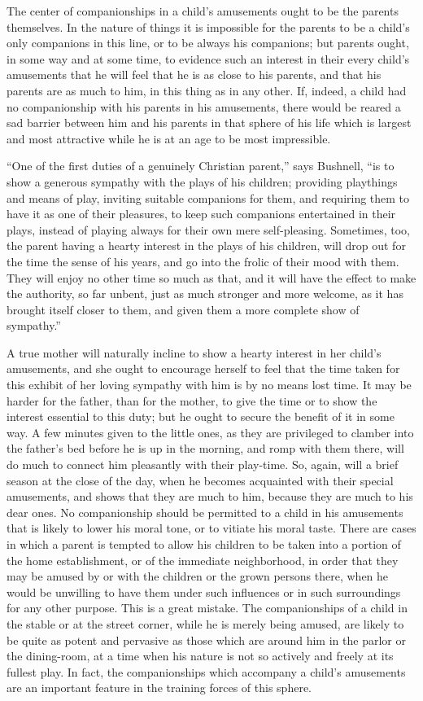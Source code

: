 \documentclass[
]{book}
\begin{document}
The center of companionships in a child's amusements ought to be the parents themselves. In the nature of things it is impossible for the parents to be a child's only companions in this line, or to be always his companions; but parents ought, in some way and at some time, to evidence such an interest in their every child's amusements that he will feel that he is as close to his parents, and that his parents are as much to him, in this thing as in any other. If, indeed, a child had no companionship with his parents in his amusements, there would be reared a sad barrier between him and his parents in that sphere of his life which is largest and most attractive while he is at an age to be most impressible.

``One of the first duties of a genuinely Christian parent,'' says Bushnell, ``is to show a generous sympathy with the plays of his children; providing playthings and means of play, inviting suitable companions for them, and requiring them to have it as one of their pleasures, to keep such companions entertained in their plays, instead of playing always for their own mere self-pleasing. Sometimes, too, the parent having a hearty interest in the plays of his children, will drop out for the time the sense of his years, and go into the frolic of their mood with them. They will enjoy no other time so much as that, and it will have the effect to make the authority, so far unbent, just as much stronger and more welcome, as it has brought itself closer to them, and given them a more complete show of sympathy.''

A true mother will naturally incline to show a hearty interest in her child's amusements, and she ought to encourage herself to feel that the time taken for this exhibit of her loving sympathy with him is by no means lost time. It may be harder for the father, than for the mother, to give the time or to show the interest essential to this duty; but he ought to secure the benefit of it in some way. A few minutes given to the little ones, as they are privileged to clamber into the father's bed before he is up in the morning, and romp with them there, will do much to connect him pleasantly with their play-time. So, again, will a brief season at the close of the day, when he becomes acquainted with their special amusements, and shows that they are much to him, because they are much to his dear ones. No companionship should be permitted to a child in his amusements that is likely to lower his moral tone, or to vitiate his moral taste. There are cases in which a parent is tempted to allow his children to be taken into a portion of the home establishment, or of the immediate neighborhood, in order that they may be amused by or with the children or the grown persons there, when he would be unwilling to have them under such influences or in such surroundings for any other purpose. This is a great mistake. The companionships of a child in the stable or at the street corner, while he is merely being amused, are likely to be quite as potent and pervasive as those which are around him in the parlor or the dining-room, at a time when his nature is not so actively and freely at its fullest play. In fact, the companionships which accompany a child's amusements are an important feature in the training forces of this sphere.
\end{document}
